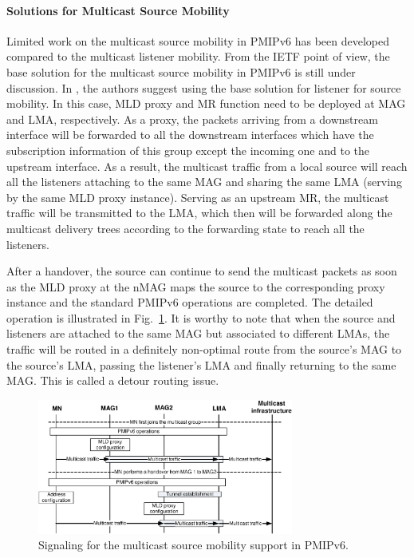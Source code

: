 \paragraph{Solutions for Multicast Source Mobility \\}
Limited work on the multicast source mobility in PMIPv6 has been developed compared to the multicast listener mobility. From the IETF point of view, the base solution for the multicast source mobility in PMIPv6 is still under discussion. In \cite{multicast_source}, the authors suggest using the base solution for listener for source mobility. In this case, MLD proxy and MR function need to be deployed at MAG and LMA, respectively. As a proxy, the packets arriving from a downstream interface will be forwarded to all the downstream interfaces which have the subscription information of this group except the incoming one and to the upstream interface. As a result, the multicast traffic from a local source will reach all the listeners attaching to the same MAG and sharing the same LMA (serving by the same MLD proxy instance). Serving as an upstream MR, the multicast traffic will be transmitted to the LMA, which then will be forwarded along the multicast delivery trees according to the forwarding state to reach all the listeners.

After a handover, the source can continue to send the multicast packets as soon as the MLD proxy at the nMAG maps the source to the corresponding proxy instance and the standard PMIPv6 operations are completed. The detailed operation is illustrated in Fig.~\ref{fig:c4_source_base}. It is worthy to note that when the source and listeners are attached to the same MAG but associated to different LMAs, the traffic will be routed in a definitely non-optimal route from the source's MAG to the source’s LMA, passing the listener’s LMA and finally returning to the same MAG. This is called a detour routing issue. 
\begin{figure}[h!] 
 \begin{center} 
 \includegraphics[width=0.75\textwidth]{./Part1/Chapter2/figures/c4_source_base.eps} 
    \caption{Signaling for the multicast source mobility support in PMIPv6.}
     \label{fig:c4_source_base}
  \end{center} 
\end{figure}

